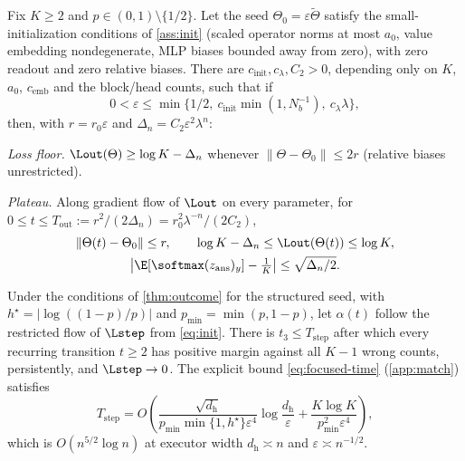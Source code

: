 \begin{theorem}\label{thm:outcome}\label{thm:outcome-end}
Fix $K\ge2$ and $p\in(0,1)\setminus\{1/2\}$. Let the seed $\Theta_0=\varepsilon\tilde\Theta$ satisfy the small-initialization conditions of \cref{ass:init} (scaled operator norms at most $a_0$, value embedding nondegenerate, MLP biases bounded away from zero), with zero readout and zero relative biases. There are $c_{\mathrm{init}},c_\lambda,C_2>0$, depending only on $K$, $a_0$, $c_{\mathrm{emb}}$ and the block/head counts, such that if
\begin{equation}\label{eq:small}
0<\varepsilon\le\min\{1/2,\ c_{\mathrm{init}}\min(1,N_b^{-1}),\ c_\lambda\lambda\},
\end{equation}
then, with $r=r_0\varepsilon$ and $\Delta_n=C_2\varepsilon^2\lambda^n$:
\begin{thmparts}
\item \emph{Loss floor.} $\Lout(\Theta)\ge\log K-\Delta_n$ whenever $\|\Theta-\Theta_0\|\le2r$ (relative biases unrestricted).
\item \emph{Plateau.} Along gradient flow of $\Lout$ on every parameter, for $0\le t\le T_{\mathrm{out}}:=r^2/(2\Delta_n)=r_0^2\lambda^{-n}/(2C_2)$,
\begin{equation}\label{eq:plateau}
\begin{gathered}
\|\Theta(t)-\Theta_0\|\le r,\qquad
\log K-\Delta_n\le\Lout(\Theta(t))\le\log K,\\
\bigl|\E[\softmax(z_{\mathrm{ans}})_y]-\tfrac1K\bigr|\le\sqrt{\Delta_n/2}.
\end{gathered}
\end{equation}
\end{thmparts}
\end{theorem}

\begin{theorem}\label{thm:step}
Under the conditions of \cref{thm:outcome} for the structured seed, with $h^\star=|\log((1-p)/p)|$ and $p_{\min}=\min(p,1-p)$, let $\alpha(t)$ follow the restricted flow of $\Lstep$ from \cref{eq:init}. There is $t_3\le T_{\mathrm{step}}$ after which every recurring transition $t\ge2$ has positive margin against all $K-1$ wrong counts, persistently, and $\Lstep\to0$. The explicit bound \cref{eq:focused-time} (\cref{app:match}) satisfies
\[
T_{\mathrm{step}}=O\!\left(\frac{\sqrt{d_{\mathrm h}}}{p_{\min}\min\{1,h^\star\}\varepsilon^4}\log\frac{d_{\mathrm h}}{\varepsilon}+\frac{K\log K}{p_{\min}^2\varepsilon^4}\right),
\]
which is $O(n^{5/2}\log n)$ at executor width $d_{\mathrm h}\asymp n$ and $\varepsilon\asymp n^{-1/2}$.
\end{theorem}

